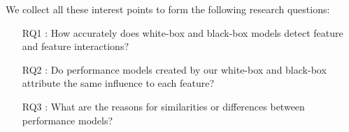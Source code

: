 We collect all these interest points to form the following research questions:

\begin{itemize}\label{researchQuestions}
\item[RQ1]: How accurately does white-box and black-box models detect feature and feature interactions? 
\item[RQ2]: Do performance models created by our white-box and black-box attribute the same influence to each feature?
\item[RQ3]: What are the reasons for similarities or differences between performance models?
\end{itemize}
